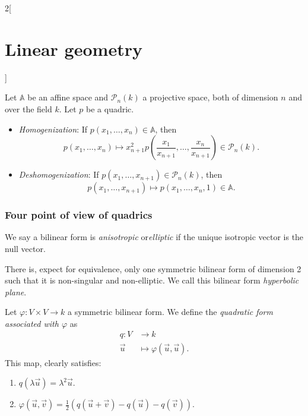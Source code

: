\documentclass[class=article,10pt,crop=false]{standalone}
\begin{document}
\begin{multicols}{2}[\section{Linear geometry}]
\begin{theorem}
\end{theorem}
\begin{prop}
Let $\mathbb{A}$ be an affine space and $\mathcal{P}_n(k)$ a projective space, both of dimension $n$ and over the field $k$. Let $p$ be a quadric. 
\begin{itemize}
    \item\textit{Homogenization}: If $p(x_1,\ldots,x_n)\in\mathbb{A}$, then $$p(x_1,\ldots,x_n)\mapsto x_{n+1}^2p\left(\frac{x_1}{x_{n+1}},\ldots,\frac{x_n}{x_{n+1}}\right)\in\mathcal{P}_n(k).$$
    \item\textit{Deshomogenization}: If $p(x_1,\ldots,x_{n+1})\in\mathcal{P}_n(k)$, then $$p(x_1,\ldots,x_{n+1})\mapsto p(x_1,\ldots,x_n,1)\in\mathbb{A}.$$
\end{itemize}
\end{prop}
\subsubsection{Four point of view of quadrics}
\begin{definition}
We say a bilinear form is \textit{anisotropic} or\textit{elliptic} if the unique isotropic vector is the null vector.
\end{definition}
\begin{theorem}
There is, expect for equivalence, only one symmetric bilinear form of dimension 2 such that it is non-singular and non-elliptic. We call this bilinear form \textit{hyperbolic plane}.
\end{theorem}
\begin{definition}
Let $\varphi:V\times V\rightarrow k$ a symmetric bilinear form. We define the \textit{quadratic form associated with $\varphi$} as 
\begin{align*}
    q:V&\rightarrow k\\
    \overrightarrow{u}&\mapsto\varphi(\overrightarrow{u},\overrightarrow{u}).
\end{align*} This map, clearly satisfies:
\begin{enumerate}
    \item $q(\lambda\overrightarrow{u})=\lambda^2\overrightarrow{u}$.
    \item $\displaystyle\varphi(\overrightarrow{u},\overrightarrow{v})=\frac{1}{2}\left(q(\overrightarrow{u}+\overrightarrow{v})-q(\overrightarrow{u})-q(\overrightarrow{v})\right)$.
\end{enumerate}
\end{definition}
\begin{prop}

\end{prop}
\end{multicols}
\end{document}
